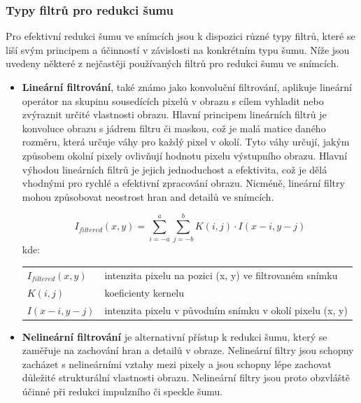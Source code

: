 \documentclass[male,czech,api_ing]{thesis}
\makeatletter
\newenvironment{conditions}[1][kde:]
    {#1 \begin{tabular}[t]{>{$}l<{$} @{${}={}$} >{\raggedright\arraybackslash}p{10cm}}}
    {\end{tabular}}
\makeatother
\begin{document}
\subsubsection{Typy filtrů pro redukci šumu}
Pro efektivní redukci šumu ve snímcích jsou k dispozici různé typy filtrů, které se liší svým principem a účinností v závislosti na konkrétním typu šumu. Níže jsou uvedeny některé z nejčastěji používaných filtrů pro redukci šumu ve snímcích.

\begin{itemize}
    \item \textbf{Lineární filtrování}, také známo jako konvoluční filtrování, aplikuje lineární operátor na skupinu sousedících pixelů v obrazu s cílem vyhladit nebo zvýraznit určité vlastnosti obrazu. Hlavní principem lineárních filtrů je konvoluce obrazu s jádrem filtru či maskou, což je malá matice daného rozměru, která určuje váhy pro každý pixel v okolí. Tyto váhy určují, jakým způsobem okolní pixely ovlivňují hodnotu pixelu výstupního obrazu. Hlavní výhodou lineárních filtrů je jejich jednoduchost a efektivita, což je dělá vhodnými pro rychlé a efektivní zpracování obrazu. Nicméně, lineární filtry mohou způsobovat neostrost hran and detailů ve snímcích. \cite{ImageDenoisingTechniques, XRayImageProcessing}
    
    \begin{equation}
        I_{filtered}(x, y) = \sum_{i=-a}^{a} \sum_{j=-b}^{b} K(i, j) \cdot I(x-i, y-j)
    \end{equation}
    \begin{conditions}
        I_{filtered}(x, y) & intenzita pixelu na pozici (x, y) ve filtrovaném snímku \\
        K(i, j) & koeficienty kernelu \\
        I(x-i, y-j) & intenzita pixelu v původním snímku v okolí pixelu (x, y) 
    \end{conditions}
    \item \textbf{Nelineární filtrování} je alternativní přístup k redukci šumu, který se zaměřuje na zachování hran a detailů v obraze. Nelineární filtry jsou schopny zacházet s nelineárními vztahy mezi pixely a jsou schopny lépe zachovat důležité strukturální vlastnosti obrazu. Nelineární filtry jsou proto obzvláště účinné při redukci impulzního či speckle šumu. \cite{ImageDenoisingTechniques, XRayImageProcessing}
\end{itemize}
\end{document}
